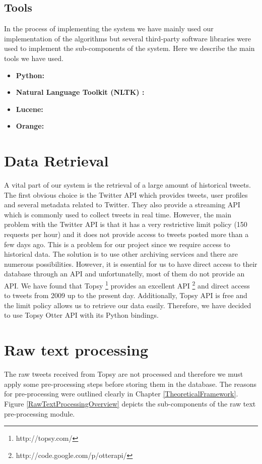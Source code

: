 \subsection{Tools}
In the process of implementing the system we have mainly used our implementation of the algorithms but several third-party 
software libraries were used to implement the sub-components of the system. Here we describe the main tools we have used.\\ 

\begin{itemize}
 \item \textbf{Python:} 
 \item \textbf{Natural Language Toolkit (NLTK) :} 
 \item \textbf{Lucene:} 
 \item \textbf{Orange:} 
\end{itemize}\vspace{15pt}

\section{Data Retrieval}
A vital part of our system is the retrieval of a large amount of historical tweets. The first obvious choice is the Twitter API which provides tweets, user profiles and several metadata related to Twitter. They also provide a streaming API which is commonly used to collect tweets in real time. However, the main problem with the Twitter API is that it has a very restrictive limit policy (150 requests per hour) and it does not provide access to tweets posted more than a few days ago. This is a problem for our project since we require access to historical data. The solution is to use other archiving services and there are numerous possibilities. However, it is essential for us to have direct access to their database through an API and unfortunatelly, most of them do not provide an API. We have found that Topsy \footnote{http://topsy.com/} provides an excellent API \footnote{http://code.google.com/p/otterapi/} and direct access to tweets from 2009 up to the present day. Additionally, Topsy API is free and the limit policy allows us to retrieve our data easily. Therefore, we have decided to use Topsy Otter API with its Python bindings.

\section{Raw text processing}
The raw tweets received from Topsy are not processed and therefore we must apply some pre-processing steps before storing them in the database. The reasons for pre-processing were outlined clearly in Chapter \ref{TheoreticalFramework}. Figure \ref{RawTextProcessingOverview} depicts the sub-components of the raw text pre-processing module.\\

